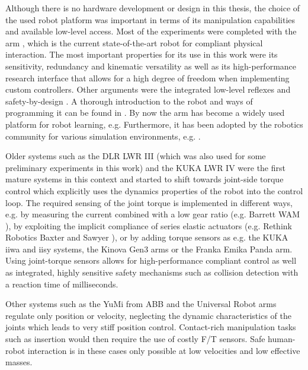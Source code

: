 Although there is no hardware development or design in this thesis, the choice of the used robot platform was important in terms of its manipulation capabilities and available low-level access.
Most of the experiments were completed with the \platformname{} arm \cite{Haddadin.2022,AlejandrodelaGarza.2018}, which is the current state-of-the-art robot for compliant physical interaction.
The most important properties for its use in this work were its sensitivity, redundancy and kinematic versatility as well as its high-performance research interface that allows for a high degree of freedom when implementing custom controllers.
Other arguments were the integrated low-level reflexes \cite{Haddadin.2017b} and safety-by-design \cite{Haddadin.2009,Haddadin.2009b}.
A thorough introduction to the robot and ways of programming it can be found in \cite{Haddadin.2022}.
By now the \platformname{} arm has become a widely used platform for robot learning, e.g. \cite{James.2020,NoemieJaquier.2020,Chen.2021,Roveda.2020}
Furthermore, it has been adopted by the robotics community for various simulation environments, e.g. \cite{James.2020,Chebotar.2019}.

Older systems such as the DLR LWR III \cite{Hirzinger.2002,AlbuSchaffer.2007} (which was also used for some preliminary experiments in this work) and the KUKA LWR IV \cite{Bischoff.2010} were the first mature systems in this context and started to shift towards joint-side torque control which explicitly uses the dynamics properties of the robot into the control loop.
The required sensing of the joint torque is implemented in different ways, e.g. by measuring the current combined with a low gear ratio (e.g. Barrett WAM \cite{Rooks.2006}), by exploiting the implicit compliance of series elastic actuators (e.g. Rethink Robotics Baxter \cite{Fitzgerald.2013} and Sawyer \cite{RethinkRobotics.2015}), or by adding torque sensors as e.g. the KUKA iiwa \cite{KUKAAG.06.02.2021} and iisy \cite{Treffler.31.01.2019} systems, the Kinova Gen3 arms \cite{campeau2019kinova} or the Franka Emika Panda arm.
Using joint-torque sensors allows for high-performance compliant control as well as integrated, highly sensitive safety mechanisms such as collision detection with a reaction time of milliseconds.

Other systems such as the YuMi from ABB \cite{Kirgis.2016} and the Universal Robot arms \cite{UniversalRobots.06.02.2021} regulate only position or velocity, neglecting the dynamic characteristics of the joints which leads to very stiff position control.
Contact-rich manipulation tasks such as insertion would then require the use of costly F/T sensors.
Safe human-robot interaction is in these cases only possible at low velocities and low effective masses.

